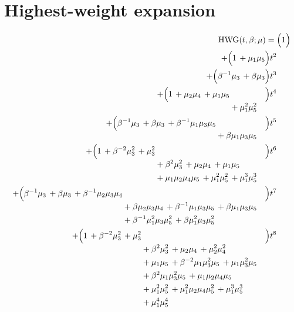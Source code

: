 \documentclass[10pt]{article}
\begin{document}
\section{Highest-weight expansion}
\[
\begin{aligned}
\mathrm{HWG}(t,\beta;\mu) ={}&
   \Bigl(1\Bigr) \\
  + \Bigl(1\,+\mu_1\mu_5\Bigr)t^{2} \\
  + \Bigl(\beta^{-1}\mu_3\,+\beta\mu_3\Bigr)t^{3} \\
  + \Bigl(\begin{aligned}[t]1\,+\mu_2\mu_4\,+\mu_1\mu_5 \\
  &{}+\mu_1^{2}\mu_5^{2}\end{aligned}\Bigr)t^{4} \\
  + \Bigl(\begin{aligned}[t]\beta^{-1}\mu_3\,+\beta\mu_3\,+\beta^{-1}\mu_1\mu_3\mu_5 \\
  &{}+\beta\mu_1\mu_3\mu_5\end{aligned}\Bigr)t^{5} \\
  + \Bigl(\begin{aligned}[t]1\,+\beta^{-2}\mu_3^{2}\,+\mu_3^{2} \\
  &{}+\beta^{2}\mu_3^{2}\,+\mu_2\mu_4\,+\mu_1\mu_5 \\
  &{}+\mu_1\mu_2\mu_4\mu_5\,+\mu_1^{2}\mu_5^{2}\,+\mu_1^{3}\mu_5^{3}\end{aligned}\Bigr)t^{6} \\
  + \Bigl(\begin{aligned}[t]\beta^{-1}\mu_3\,+\beta\mu_3\,+\beta^{-1}\mu_2\mu_3\mu_4 \\
  &{}+\beta\mu_2\mu_3\mu_4\,+\beta^{-1}\mu_1\mu_3\mu_5\,+\beta\mu_1\mu_3\mu_5 \\
  &{}+\beta^{-1}\mu_1^{2}\mu_3\mu_5^{2}\,+\beta\mu_1^{2}\mu_3\mu_5^{2}\end{aligned}\Bigr)t^{7} \\
  + \Bigl(\begin{aligned}[t]1\,+\beta^{-2}\mu_3^{2}\,+\mu_3^{2} \\
  &{}+\beta^{2}\mu_3^{2}\,+\mu_2\mu_4\,+\mu_2^{2}\mu_4^{2} \\
  &{}+\mu_1\mu_5\,+\beta^{-2}\mu_1\mu_3^{2}\mu_5\,+\mu_1\mu_3^{2}\mu_5 \\
  &{}+\beta^{2}\mu_1\mu_3^{2}\mu_5\,+\mu_1\mu_2\mu_4\mu_5 \\
  &{}+\mu_1^{2}\mu_5^{2}\,+\mu_1^{2}\mu_2\mu_4\mu_5^{2}\,+\mu_1^{3}\mu_5^{3} \\
  &{}+\mu_1^{4}\mu_5^{4}\end{aligned}\Bigr)t^{8} \\

\end{aligned}\]
\end{document}

